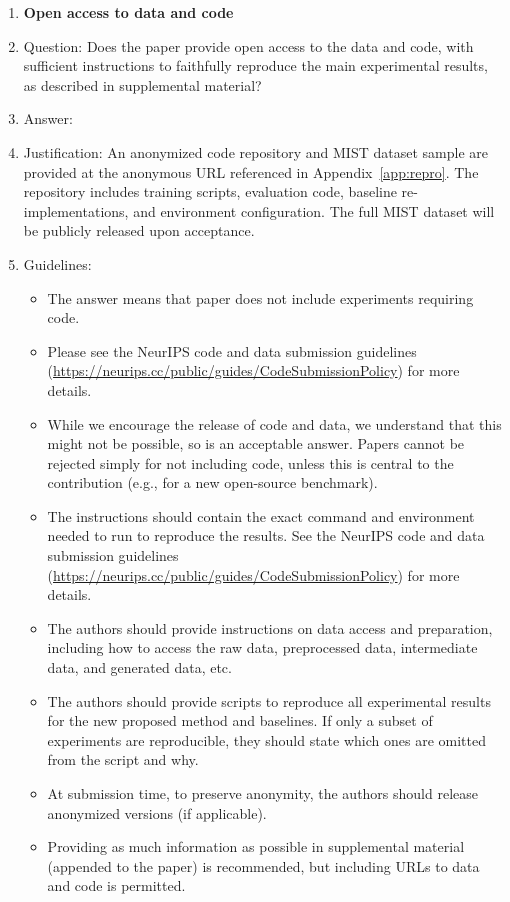 \begin{enumerate}
\item {\bf Open access to data and code}
    \item[] Question: Does the paper provide open access to the data and code, with sufficient instructions to faithfully reproduce the main experimental results, as described in supplemental material?
    \item[] Answer: \answerYes{}
    \item[] Justification: An anonymized code repository and MIST dataset sample are provided at the anonymous URL referenced in Appendix~\ref{app:repro}. The repository includes training scripts, evaluation code, baseline re-implementations, and environment configuration. The full MIST dataset will be publicly released upon acceptance.
    \item[] Guidelines:
    \begin{itemize}
        \item The answer \answerNA{} means that paper does not include experiments requiring code.
        \item Please see the NeurIPS code and data submission guidelines (\url{https://neurips.cc/public/guides/CodeSubmissionPolicy}) for more details.
        \item While we encourage the release of code and data, we understand that this might not be possible, so \answerNo{} is an acceptable answer. Papers cannot be rejected simply for not including code, unless this is central to the contribution (e.g., for a new open-source benchmark).
        \item The instructions should contain the exact command and environment needed to run to reproduce the results. See the NeurIPS code and data submission guidelines (\url{https://neurips.cc/public/guides/CodeSubmissionPolicy}) for more details.
        \item The authors should provide instructions on data access and preparation, including how to access the raw data, preprocessed data, intermediate data, and generated data, etc.
        \item The authors should provide scripts to reproduce all experimental results for the new proposed method and baselines. If only a subset of experiments are reproducible, they should state which ones are omitted from the script and why.
        \item At submission time, to preserve anonymity, the authors should release anonymized versions (if applicable).
        \item Providing as much information as possible in supplemental material (appended to the paper) is recommended, but including URLs to data and code is permitted.
    \end{itemize}



\end{enumerate}
